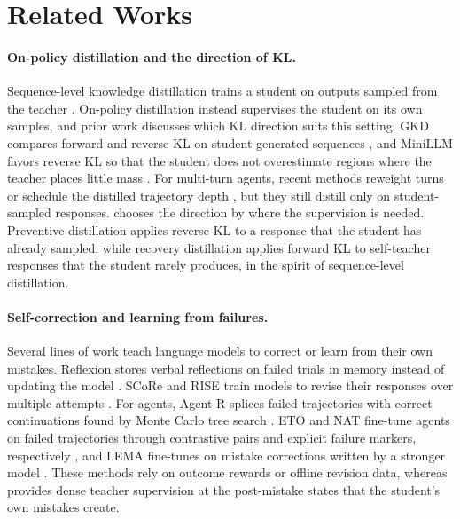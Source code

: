 \section{Related Works}
\label{app:related_work}

\paragraph{On-policy distillation and the direction of KL.} Sequence-level knowledge distillation trains a student on outputs sampled from the teacher \citep{kim2016sequence, yang2026sfd}. On-policy distillation instead supervises the student on its own samples, and prior work discusses which KL direction suits this setting. GKD compares forward and reverse KL on student-generated sequences \citep{agarwal2024gkd}, and MiniLLM favors reverse KL so that the student does not overestimate regions where the teacher places little mass \citep{gu2024minillm,lu2025onpolicydistillation}. For multi-turn agents, recent methods reweight turns or schedule the distilled trajectory depth \citep{zhou2026turnopd,wang2026tcod,zhong2026sod,zhang2026stepopsd,wang2026agentopsd}, but they still distill only on student-sampled responses. \method{} chooses the direction by where the supervision is needed. Preventive distillation applies reverse KL to a response that the student has already sampled, while recovery distillation applies forward KL to self-teacher responses that the student rarely produces, in the spirit of sequence-level distillation.

\paragraph{Self-correction and learning from failures.} Several lines of work teach language models to correct or learn from their own mistakes. Reflexion stores verbal reflections on failed trials in memory instead of updating the model \citep{shinn2023reflexion}. SCoRe and RISE train models to revise their responses over multiple attempts \citep{kumar2024score,qu2024rise}. For agents, Agent-R splices failed trajectories with correct continuations found by Monte Carlo tree search \citep{yuan2025agentr}. ETO and NAT fine-tune agents on failed trajectories through contrastive pairs and explicit failure markers, respectively \citep{song2024eto,wang2024nat}, and LEMA fine-tunes on mistake corrections written by a stronger model \citep{an2023lema}. These methods rely on outcome rewards or offline revision data, whereas \method{} provides dense teacher supervision at the post-mistake states that the student's own mistakes create.

